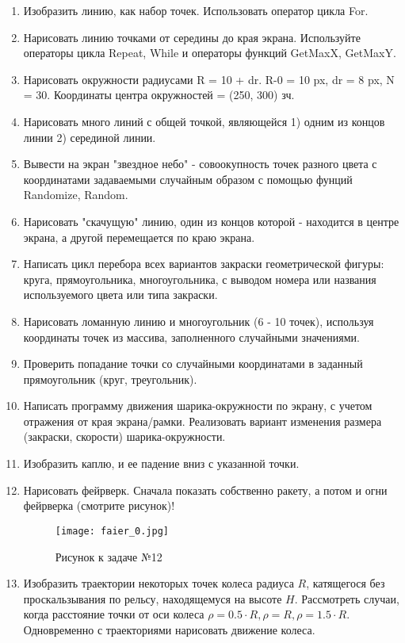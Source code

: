 \begin{enumerate}
  \item Изобразить линию, как набор точек. Использовать оператор цикла For.
  \item Нарисовать линию точками от середины до края экрана. Используйте  операторы цикла Repeat, While и операторы функций GetMaxX, GetMaxY.
  \item Нарисовать окружности радиусами R = 10 + dr. R-0 = 10 px, dr = 8 px, N = 30. Координаты центра окружностей = (250, 300) зч.
  \item Нарисовать много линий с общей точкой, являющейся 1) одним из концов линии 2) серединой линии.
  \item Вывести на экран "звездное небо" - совоокупность точек разного цвета с координатами задаваемыми случайным образом с помощью фунций Randomize, Random.
  \item Нарисовать "скачущую" линию, один из концов которой - находится в центре экрана, а другой перемещается по краю экрана. 
  \item Написать цикл перебора всех вариантов закраски геометрической фигуры: круга, прямоугольника, многоугольника, с выводом номера или названия используемого цвета или типа закраски.
  \item Нарисовать ломанную линию и многоугольник (6 - 10 точек), используя координаты точек  из массива, заполненного случайными значениями. 
  \item Проверить попадание точки со случайными координатами в заданный прямоугольник (круг, треугольник).
  
  \item Написать программу движения шарика-окружности по экрану, с учетом отражения от края экрана/рамки. 
        Реализовать вариант изменения размера (закраски, скорости) шарика-окружности.

 \item  Изобразить каплю, и ее падение вниз с указанной точки.
  
 \item  Нарисовать фейрверк. Сначала показать  собственно ракету, а  потом и огни фейрверка  (смотрите рисунок)!
 
\begin{figure}[!h]
\centerline{
\texttt{[image: faier\_0.jpg]}}
\caption{Рисунок к задаче №12}
\label{ris4}
\end{figure}

\item  Изобразить траектории некоторых точек колеса радиуса $R$, катящегося без проскальзывания по рельсу, находящемуся на высоте $H$. Рассмотреть случаи, когда расстояние точки от оси колеса $\rho = 0.5\cdot R, \rho = R, \rho = 1.5\cdot R$. Одновременно с траекториями нарисовать движение колеса.


\end{enumerate}
